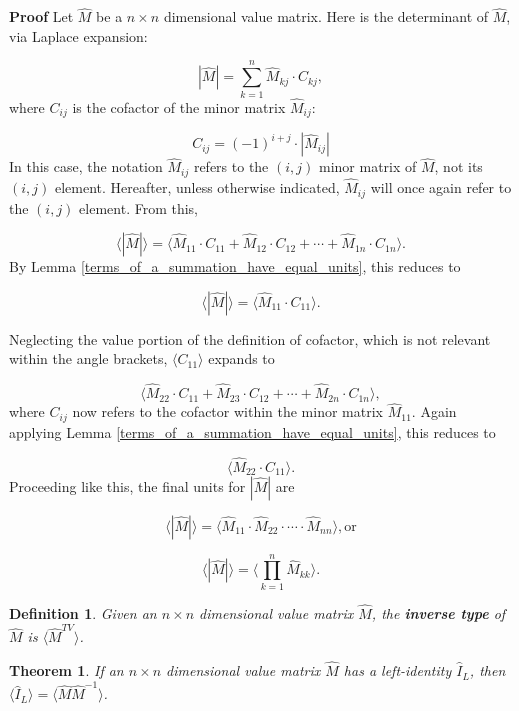 \documentclass[10pt,letterpaper]{article}
\newtheorem{defn}{Definition}[section]
\newtheorem{thm}{Theorem}[section]
\newenvironment{proof}{\noindent\textbf{Proof} }{\qed \newline}
\newcommand{\qed}{\nobreak \ifvmode \relax \else
      \ifdim\lastskip<1.5em \hskip-\lastskip
      \hskip1.5em plus0em minus0.5em \fi \nobreak
      \vrule height0.75em width0.5em depth0.25em\fi}
\numberwithin{equation}{section}
\begin{document}
\begin{proof}Let $\hat M$ be a $n \times n$ dimensional value matrix.
  Here is the determinant of $\hat M$, via Laplace expansion:

\[ | \hat M | = \sum_{k=1}^n \hat M_{kj} \cdot C_{kj} , \] where $C_{ij}$ is the
cofactor of the minor matrix $\hat M_{ij}$:

\[ C_{ij} = (-1)^{i + j} \cdot | \hat M_{ij} | \] In this case, the
notation $\hat M_{ij}$ refers to the $(i, j)$ minor matrix of $\hat
M$, not its $(i, j)$ element. Hereafter, unless otherwise indicated,
$\hat M_{ij}$ will once again refer to the $(i, j)$ element.  From
this,

\[ \langle | \hat M | \rangle = \langle \hat M_{11} \cdot C_{11} +
\hat M_{12} \cdot C_{12} + \cdots + \hat M_{1n} \cdot C_{1n}\rangle
. \] By Lemma \ref{terms_of_a_summation_have_equal_units}, this
reduces to

\[ \langle | \hat M | \rangle = \langle \hat M_{11} \cdot C_{11}
\rangle . \]

Neglecting the value portion of the definition of cofactor, which is
not relevant within the angle brackets, $\langle C_{11} \rangle$
expands to

\[ \langle \hat M_{22} \cdot C_{11} + \hat M_{23} \cdot C_{12} +
\cdots + \hat M_{2n} \cdot C_{1n} \rangle , \] where $C_{ij}$ now
refers to the cofactor within the minor matrix $\hat M_{11}$.  Again
applying Lemma \ref{terms_of_a_summation_have_equal_units}, this
reduces to

\[ \langle \hat M_{22} \cdot C_{11} \rangle . \]  Proceeding like
this, the final units for $| \hat M |$ are

\[ \langle | \hat M | \rangle = \langle \hat M_{11} \cdot \hat M_{22}
\cdot \cdots \cdot \hat M_{nn} \rangle , \mbox{or} \]

\[ \langle | \hat M | \rangle = \langle \prod_{k=1}^n \hat M_{kk}
\rangle . \] \end{proof}

\begin{defn}\label{inverse_type_definition} Given an $n \times n$
dimensional value matrix $\hat M$, the \textbf{inverse type} of
$\hat M$ is $\langle \hat M^{TV} \rangle$. \end{defn}

\begin{thm}\label{IL_is_constructible_from_inverse} If an $n \times n$
dimensional value matrix $\hat M$ has a left-identity $\hat I_L$, then
$\langle \hat I_L \rangle = \langle \hat M \hat M^{-1} \rangle$. \end{thm}
\end{document}
